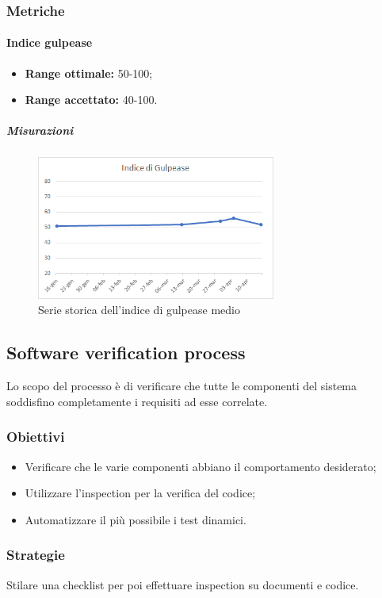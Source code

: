 		\subsubsection{Metriche}
			\paragraph{Indice gulpease} \Spazio
			\begin{itemize}
				\item \textbf{Range ottimale:} 50-100;
				\item \textbf{Range accettato:} 40-100.
			\end{itemize}
            \subparagraph{Misurazioni}
            \begin{figure}[H]
            	\centering 
            	\includegraphics[width=0.7\textwidth]{Images/Gulpease.png}
            	\caption{Serie storica dell'indice di gulpease medio}
            	\label{gul} 
            \end{figure}
	\subsection{Software verification process}
	Lo scopo del processo è di verificare che tutte le componenti del sistema soddisfino completamente i requisiti ad esse correlate.
		\subsubsection{Obiettivi}
		\begin{itemize}
			\item Verificare che le varie componenti abbiano il comportamento desiderato;
			\item Utilizzare l'inspection per la verifica del codice;
			\item Automatizzare il più possibile i test dinamici.
		\end{itemize}
		\subsubsection{Strategie}
		Stilare una checklist per poi effettuare inspection su documenti e codice.
